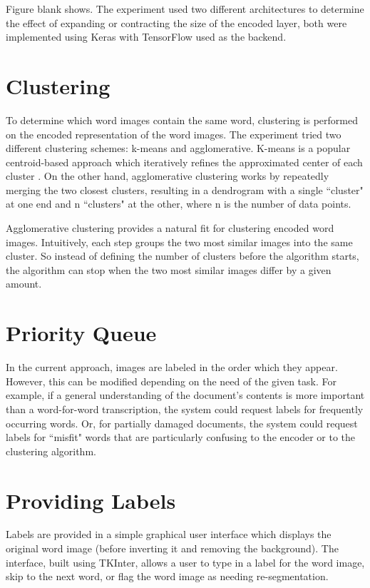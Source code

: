 \documentclass[final]{ukthesis}
\begin{document}
Figure blank shows. The experiment used two different architectures to determine the effect of expanding or contracting the size of the encoded layer, both were implemented using Keras \cite{chollet2015keras} with TensorFlow \cite{abadi2016tensorflow} used as the backend.


\section{Clustering}
To determine which word images contain the same word, clustering is performed on the encoded representation of the word images. The experiment tried two different clustering schemes: k-means and agglomerative. K-means is a popular centroid-based approach which iteratively refines the approximated center of each cluster \cite{lloyd1982least,likas2003global}. On the other hand, agglomerative clustering works by repeatedly merging the two closest clusters, resulting in a dendrogram with a single ``cluster" at one end and n ``clusters" at the other, where n is the number of data points.

Agglomerative clustering provides a natural fit for clustering encoded word images. Intuitively, each step groups the two most similar images into the same cluster. So instead of defining the number of clusters before the algorithm starts, the algorithm can stop when the two most similar images differ by a given amount.


\section{Priority Queue}
In the current approach, images are labeled in the order which they appear. However, this can be modified depending on the need of the given task. For example, if a general understanding of the document's contents is more important than a word-for-word transcription, the system could request labels for frequently occurring words. Or, for partially damaged documents, the system could request labels for ``misfit" words that are particularly confusing to the encoder or to the clustering algorithm.


\section{Providing Labels}
Labels are provided in a simple graphical user interface which displays the original word image (before inverting it and removing the background). The interface, built using TKInter, allows a user to type in a label for the word image, skip to the next word, or flag the word image as needing re-segmentation.
\end{document}
